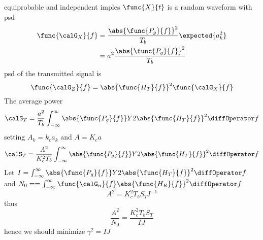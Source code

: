 equiprobable and independent imples \(\func{X}{t}\) is a random waveform with psd 
\begin{align*}
    \func{\calG_X}{f} &= \dfrac{\abs{\func{P_g}{f}}^2}{T_b} \expected{a_k^2}\\
    &= a^2\dfrac{\abs{\func{P_g}{f}}^2}{T_b} 
\end{align*}
psd of the transmitted signal is 
\begin{equation*}
    \func{\calG_Z}{f} = \abs{\func{H_T}{f}}^2 \func{\calG_X}{f}
\end{equation*}
The average power 
\begin{equation*}
    \calS_T = \dfrac{a^2}{T_b} \int_{-\infty}^{\infty} \abs{\func{P_g}{f}}Y2 \abs{\func{H_T}{f}}^2 \diffOperator f
\end{equation*}
setting \(A_k = k_ca_k\) and \(A = K_ca\)
\begin{equation*}
    \calS_T = \dfrac{A^2}{K_c^2T_b} \int_{-\infty}^{\infty} \abs{\func{P_g}{f}}Y2 \abs{\func{H_T}{f}}^2 \diffOperator f
\end{equation*}
Let \(I = \int_{-\infty}^{\infty} \abs{\func{P_g}{f}}Y2 \abs{\func{H_T}{f}}^2 \diffOperator f\) and \(N_0 = = \int_{-\infty}^{\infty} \func{\calG_n}{f} \abs{\func{H_R}{f}}^2 \diffOperator f\)
\begin{equation*}
    A^2 = K_c^2 T_b S_T I^{-1}
\end{equation*}
thus 
\begin{equation*}
    \frac{A^2}{N_0} = \dfrac{K_c^2 T_b S_T}{IJ}
\end{equation*}
hence we should minimize \(\gamma^2 = IJ\)